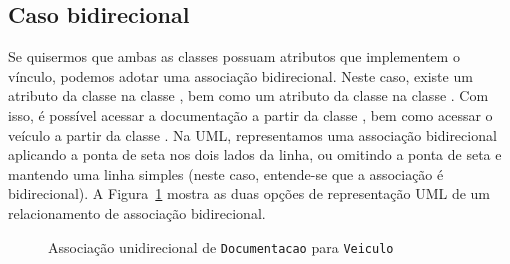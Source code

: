 \subsection{Caso bidirecional}

Se quisermos que ambas as classes possuam atributos que implementem o vínculo, podemos adotar uma associação bidirecional. Neste caso, existe um atributo da classe  na classe , bem como um atributo da classe  na classe . Com isso, é possível acessar a documentação a partir da classe , bem como acessar o veículo a partir da classe . Na UML, representamos uma associação bidirecional aplicando a ponta de seta nos dois lados da linha, ou omitindo a ponta de seta e mantendo uma linha simples (neste caso, entende-se que a associação é bidirecional). A Figura~\ref{fig:associacao-bidirecional} mostra as duas opções de representação UML de um relacionamento de associação bidirecional.

\begin{figure}[h]
	\centering
	
	
	\caption{Associação unidirecional de \texttt{Documentacao} para \texttt{Veiculo}}
	\label{fig:associacao-bidirecional}
\end{figure}

